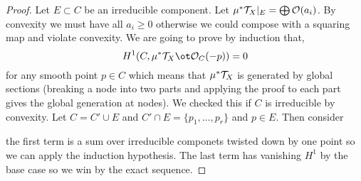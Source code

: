 \documentclass[12pt]{article}
\begin{document}
\begin{proof}
Let $E \subset C$ be an irreducible component. Let $\mu^* \mathcal{T}_X |_E = \bigoplus \mathcal{O}_{}(a_i)$. By convexity we must have all $a_i \ge 0$ otherwise we could compose with a squaring map and violate convexity. We are going to prove by induction that,
\[ H^1(C, \mu^* \T_X \ot \struct{C}(-p)) = 0 \]
for any smooth point $p \in C$ which means that $\mu^* \mathcal{T}_X$ is generated by global sections (breaking a node into two parts and applying the proof to each part gives the global generation at nodes). We checked this if $C$ is irreducible by convexity. Let $C = C' \cup E$ and $C' \cap E = \{ p_1, \dots, p_r \}$ and $p \in E$. Then consider
\begin{center}
\end{center}
the first term is a sum over irreducible componets twisted down by one point so we can apply the induction hypothesis. The last term has vanishing $H^1$ by the base case so we win by the exact sequence. 
\end{proof}
\end{document}
